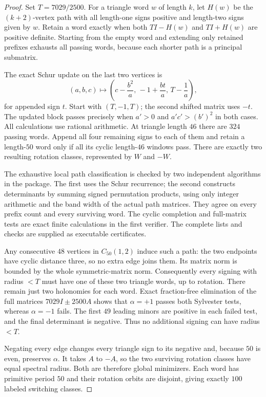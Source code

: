 \begin{proof}
Set $T=7029/2500$. For a triangle word $w$ of length $k$, let $H(w)$
be the $(k+2)$-vertex path with all length-one signs positive and
length-two signs given by $w$. Retain a word exactly when both
$TI-H(w)$ and $TI+H(w)$ are positive definite. Starting from the empty
word and extending only retained prefixes exhausts all passing words,
because each shorter path is a principal submatrix.

The exact Schur update on the last two vertices is
\[
 (a,b,c)\longmapsto
 \left(c-\frac{b^2}{a},\,-1+\frac{bt}{a},\,T-\frac1a\right),
\]
for appended sign $t$. Start with $(T,-1,T)$; the second shifted matrix
uses $-t$. The updated block passes precisely when $a'>0$ and
$a'c'>(b')^2$ in both cases. All calculations use rational arithmetic.
At triangle length $46$ there are $324$ passing words. Append all four
remaining signs to each of them and retain a length-$50$ word only if
all its cyclic length-$46$ windows pass. There are exactly two resulting
rotation classes, represented by $W$ and $-W$.

The exhaustive local path classification is checked by two independent
algorithms in the package. The first uses the Schur recurrence; the
second constructs determinants by summing signed permutation products,
using only integer arithmetic and the band width of the actual path
matrices. They agree on every prefix count and every surviving word.
The cyclic completion and full-matrix tests are exact finite calculations
in the first verifier. The complete lists and checks are supplied as
executable certificates.

Any consecutive $48$ vertices in $C_{50}(1,2)$ induce such a path:
the two endpoints have cyclic distance three, so no extra edge joins
them. Its matrix norm is bounded by the whole symmetric-matrix norm.
Consequently every signing with radius $<T$ must have one of these two
triangle words, up to rotation. There remain just two holonomies for
each word. Exact fraction-free elimination of the full matrices
$7029I\pm2500A$ shows that $\alpha=+1$ passes both Sylvester tests,
whereas $\alpha=-1$ fails. The first $49$ leading minors are positive
in each failed test, and the final determinant is negative. Thus no
additional signing can have radius $<T$.

Negating every edge changes every triangle sign to its negative and,
because $50$ is even, preserves $\alpha$. It takes $A$ to $-A$, so the
two surviving rotation classes have equal spectral radius. Both are
therefore global minimizers. Each word has primitive period $50$ and
their rotation orbits are disjoint, giving exactly $100$ labeled
switching classes.


\end{proof}
